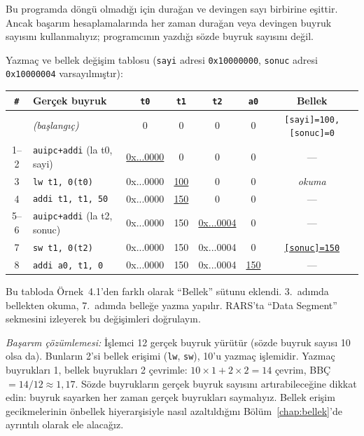 \begin{ornek}[4.2]
Bu programda döngü olmadığı için durağan ve devingen sayı birbirine eşittir. Ancak başarım hesaplamalarında her zaman durağan veya devingen buyruk sayısını kullanmalıyız; programcının yazdığı sözde buyruk sayısını değil.

Yazmaç ve bellek değişim tablosu (\texttt{sayi} adresi \texttt{0x10000000}, \texttt{sonuc} adresi \texttt{0x10000004} varsayılmıştır):

\begin{center}
\small
\begin{tabular}{clccccc}
\toprule
\texttt{\#} & Gerçek buyruk & \texttt{t0} & \texttt{t1} & \texttt{t2} & \texttt{a0} & Bellek \\
\midrule
   & \emph{(başlangıç)} & 0 & 0 & 0 & 0 & \texttt{[sayi]=100, [sonuc]=0} \\
1--2 & \texttt{auipc+addi} (la t0, sayi) & \underline{0x...0000} & 0 & 0 & 0 & --- \\
3 & \texttt{lw t1, 0(t0)} & 0x...0000 & \underline{100} & 0 & 0 & \emph{okuma} \\
4 & \texttt{addi t1, t1, 50} & 0x...0000 & \underline{150} & 0 & 0 & --- \\
5--6 & \texttt{auipc+addi} (la t2, sonuc) & 0x...0000 & 150 & \underline{0x...0004} & 0 & --- \\
7 & \texttt{sw t1, 0(t2)} & 0x...0000 & 150 & 0x...0004 & 0 & \underline{\texttt{[sonuc]=150}} \\
8 & \texttt{addi a0, t1, 0} & 0x...0000 & 150 & 0x...0004 & \underline{150} & --- \\
\bottomrule
\end{tabular}
\end{center}

Bu tabloda Örnek~4.1'den farklı olarak ``Bellek'' sütunu eklendi. 3.~adımda bellekten okuma, 7.~adımda belleğe yazma yapılır. RARS'ta ``Data Segment'' sekmesini izleyerek bu değişimleri doğrulayın.

\emph{Başarım çözümlemesi:} İşlemci 12 gerçek buyruk yürütür (sözde buyruk sayısı 10 olsa da). Bunların 2'si bellek erişimi (\texttt{lw}, \texttt{sw}), 10'u yazmaç işlemidir. Yazmaç buyrukları 1, bellek buyrukları 2 çevrimle: $10 \times 1 + 2 \times 2 = 14$ çevrim, BBÇ~$= 14/12 \approx 1{,}17$. Sözde buyrukların gerçek buyruk sayısını artırabileceğine dikkat edin: buyruk sayarken her zaman gerçek buyrukları saymalıyız. Bellek erişim gecikmelerinin önbellek hiyerarşisiyle nasıl azaltıldığını Bölüm~\ref{chap:bellek}'de ayrıntılı olarak ele alacağız.
\end{ornek}

